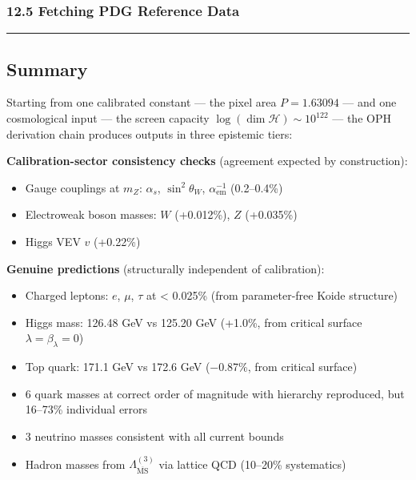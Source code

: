 \subsubsection{12.5 Fetching PDG Reference Data}\label{125-fetching-pdg-reference-data}

\begin{Shaded}
\begin{Highlighting}[]
\end{Highlighting}
\end{Shaded}

\begin{center}\rule{0.5\linewidth}{0.5pt}\end{center}

\subsection{Summary}\label{summary}

Starting from one calibrated constant --- the pixel area \(P = 1.63094\) --- and one cosmological input --- the screen capacity \(\log(\dim\mathcal{H}) \sim 10^{122}\) --- the OPH derivation chain produces outputs in three epistemic tiers:

\textbf{Calibration-sector consistency checks} (agreement expected by construction):
\begin{itemize}\tightlist
\item Gauge couplings at \(m_Z\): \(\alpha_s\), \(\sin^2\theta_W\), \(\alpha_{\text{em}}^{-1}\) (0.2--0.4\%)
\item Electroweak boson masses: \(W\) (+0.012\%), \(Z\) (+0.035\%)
\item Higgs VEV \(v\) (+0.22\%)
\end{itemize}

\textbf{Genuine predictions} (structurally independent of calibration):
\begin{itemize}\tightlist
\item Charged leptons: \(e\), \(\mu\), \(\tau\) at \textless{} 0.025\% (from parameter-free Koide structure)
\item Higgs mass: 126.48 GeV vs 125.20 GeV (+1.0\%, from critical surface \(\lambda = \beta_\lambda = 0\))
\item Top quark: 171.1 GeV vs 172.6 GeV (−0.87\%, from critical surface)
\item 6 quark masses at correct order of magnitude with hierarchy reproduced, but 16--73\% individual errors
\item 3 neutrino masses consistent with all current bounds
\item Hadron masses from \(\Lambda_{\overline{\text{MS}}}^{(3)}\) via lattice QCD (10--20\% systematics)
\end{itemize}

